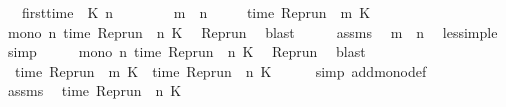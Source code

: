 \begin{isabellebody}
\ \ \ {\isacartoucheopen}first{\isacharunderscore}time\ {\isasymrho}\ K\ n\ {\isasymtau}{\isacartoucheclose}\isanewline
\ \ \ \ \ \ \ {\isacartoucheopen}m\ {\isacharless}\ n{\isacartoucheclose}\isanewline
\ \ \ \ \ {\isacartoucheopen}time\ {\isacharparenleft}{\isacharparenleft}Rep{\isacharunderscore}run\ {\isasymrho}{\isacharparenright}\ m\ K{\isacharparenright}\ {\isacharless}\ {\isasymtau}{\isacartoucheclose}\isanewline
%
\isadelimproof
%
\endisadelimproof
%
\isatagproof
{}\isamarkupfalse%
\ {\isacharminus}\isanewline
\ \ \isamarkupfalse%
\ {\isacartoucheopen}mono\ {\isacharparenleft}{\isasymlambda}n{\isachardot}\ time\ {\isacharparenleft}Rep{\isacharunderscore}run\ {\isasymrho}\ n\ K{\isacharparenright}{\isacharparenright}{\isacartoucheclose}\ \isamarkupfalse%
\ Rep{\isacharunderscore}run\ \isamarkupfalse%
\ blast\isanewline
\ \ \isamarkupfalse%
\ \isamarkupfalse%
\ assms{\isacharparenleft}{}{\isacharparenright}\ \isamarkupfalse%
\ {\isacartoucheopen}m\ {\isasymle}\ n{\isacartoucheclose}\ \isamarkupfalse%
\ less{\isacharunderscore}imp{\isacharunderscore}le\ \isamarkupfalse%
\ simp\isanewline
\ \ \isamarkupfalse%
\ \isamarkupfalse%
\ {\isacartoucheopen}mono\ {\isacharparenleft}{\isasymlambda}n{\isachardot}\ time\ {\isacharparenleft}Rep{\isacharunderscore}run\ {\isasymrho}\ n\ K{\isacharparenright}{\isacharparenright}{\isacartoucheclose}\ \isamarkupfalse%
\ Rep{\isacharunderscore}run\ \isamarkupfalse%
\ blast\isanewline
\ \ \isamarkupfalse%
\ \isamarkupfalse%
\ \ {\isacartoucheopen}time\ {\isacharparenleft}{\isacharparenleft}Rep{\isacharunderscore}run\ {\isasymrho}{\isacharparenright}\ m\ K{\isacharparenright}\ {\isasymle}\ time\ {\isacharparenleft}{\isacharparenleft}Rep{\isacharunderscore}run\ {\isasymrho}{\isacharparenright}\ n\ K{\isacharparenright}{\isacartoucheclose}\isanewline
\ \ \ \ \isamarkupfalse%
\ {\isacharparenleft}simp\ add{\isacharcolon}mono{\isacharunderscore}def{\isacharparenright}\isanewline
\ \ \isamarkupfalse%
\ \isamarkupfalse%
\ assms{\isacharparenleft}{}{\isacharparenright}\ \isamarkupfalse%
\ {\isacartoucheopen}time\ {\isacharparenleft}{\isacharparenleft}Rep{\isacharunderscore}run\ {\isasymrho}{\isacharparenright}\ n\ K{\isacharparenright}\ {\isacharequal}\ {\isasymtau}{\isacartoucheclose}\isanewline

\end{isabellebody}
